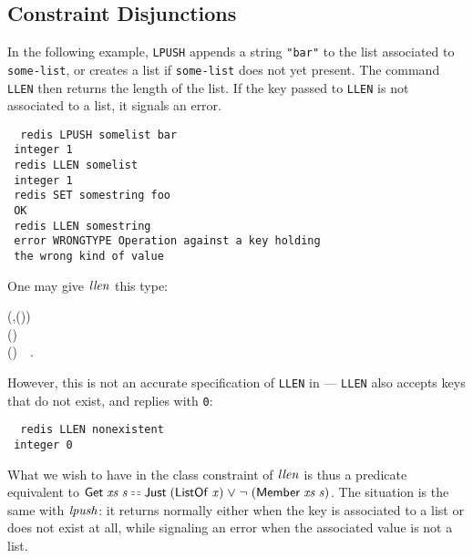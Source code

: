 
\subsection{Constraint Disjunctions}

In the following example, \texttt{LPUSH} appends a string \texttt{"bar"} to the
list associated to \texttt{some-list}, or creates a list if \texttt{some-list}
does not yet present. The command \texttt{LLEN} then returns the length of
the list. If the key passed to \texttt{LLEN} is not associated to a list,
it signals an error.
\begin{tabbing}\tt
~redis~LPUSH~somelist~bar\\
\tt ~integer~1\\
\tt ~redis~LLEN~somelist\\
\tt ~integer~1\\
\tt ~redis~SET~somestring~foo\\
\tt ~OK\\
\tt ~redis~LLEN~somestring\\
\tt ~error~WRONGTYPE~Operation~against~a~key~holding\\
\tt ~the~wrong~kind~of~value
\end{tabbing}
One may give \ensuremath{\Varid{llen}} this type:
\begin{hscode}\SaveRestoreHook
{}%
%
%
\>[B]{}\<[7]%
\>[7]{}\mathbin{::}(\;,\;\;\mathord{\sim}\;(\;)){}\<[E]%
\\
\>[7]{}\Rightarrow {}\;\to {}\;\;\;(\;\;){}\<[E]%
\\
\>[B]{}\;\mathrel{=}\mathbin{\$}\;(\;)~~.{}\<[E]%
\ColumnHook
\end{hscode}\resethooks
However, this is not an accurate specification of \texttt{LLEN} in \Redis{} ---
\texttt{LLEN} also accepts keys that do not exist, and replies with \texttt{0}:
\begin{tabbing}\tt
~redis~LLEN~nonexistent\\
\tt ~integer~0
\end{tabbing}
What we wish to have in the class constraint of \ensuremath{\Varid{llen}} is thus a predicate
equivalent to \ensuremath{\Conid{Get}\;\Varid{xs}\;\Varid{s}\doubleequals\Conid{Just}\;(\Conid{ListOf}\;\Varid{x})\mathrel{\vee}\neg \;(\Conid{Member}\;\Varid{xs}\;\Varid{s})}. The situation is the same with \ensuremath{\Varid{lpush}}: it returns normally either when
the key is associated to a list or does not exist at all, while signaling an
error when the associated value is not a list.

